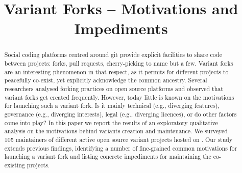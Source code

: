 

\pagestyle{fancy}
\fancyhead[r]{\thepage}




\title{Variant Forks -- Motivations and Impediments}

\author{
	}




\maketitle

\begin{abstract}
Social coding platforms centred around git provide explicit facilities to share code between projects: forks, pull requests, cherry-picking to name but a few.
Variant forks are an interesting phenomenon in that respect, as it permits for different projects to peacefully co-exist, yet explicitly acknowledge the common ancestry.
Several researchers analysed forking practices on open source platforms and observed that variant forks get created frequently.
However, today little is known on the motivations for launching such a variant fork.
Is it mainly technical (e.g., diverging features), governance (e.g., diverging interests), legal (e.g., diverging licences), or do other factors come into play?
In this paper we report the results of an exploratory qualitative analysis on the motivations behind variants creation and maintenance.
We surveyed 105 maintainers of different active open source variant projects hosted on \gh.
Our study extends previous findings, identifying a number of fine-grained common motivations for launching a variant fork and listing concrete impediments for maintaining the co-existing projects.
\end{abstract}

